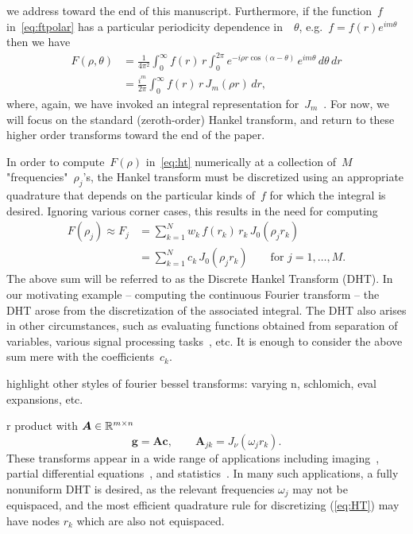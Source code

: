 we address toward the end of this manuscript. Furthermore, if the function~$f$
in~\eqref{eq:ftpolar} has a particular periodicity dependence in~~$\theta$,
e.g.~$f = f(r)e^{im\theta}$ then we have
\begin{equation}
  \begin{aligned}
  F(\rho,\theta) &= \frac{1}{4\pi^2} \int_0^\infty f(r) \, r \int_0^{2\pi} 
  e^{-i \rho r \cos(\alpha - \theta) } \, e^{im\theta}  \, d\theta \, dr \\
  &= \frac{i^m}{2\pi} \int_0^\infty f(r) \, r \, J_m(\rho r)  \, dr,
  \end{aligned}
\end{equation}
where, again, we have invoked an integral representation for~$J_m$~\cite{}.
For now, we will focus on the standard (zeroth-order) Hankel transform, and
return to these higher order transforms toward the end of the paper.

In order to compute~$F(\rho)$ in~\eqref{eq:ht} numerically at a collection
of~$M$ "frequencies"~$\rho_j$'s, the Hankel transform must be discretized using
an appropriate quadrature that depends on the particular kinds of~$f$ for which
the integral is desired. Ignoring various corner cases, this results in the need
for computing
\begin{equation}
  \begin{aligned}
  F(\rho_j) \approx F_j &= \sum_{k=1}^N w_k \, f(r_k) \, r_k \, J_0(\rho_j r_k) \\
  &= \sum_{k=1}^N c_k \, J_0(\rho_j r_k)
   \qquad \text{for } j = 1, \ldots, M.
  \end{aligned}
\end{equation}
The above sum will be referred to as the Discrete Hankel Transform (DHT). In our
motivating example -- computing the continuous Fourier transform -- the DHT
arose from the discretization of the associated integral. The DHT also arises in
other circumstances, such as evaluating functions obtained from separation of
variables, various signal processing tasks~\cite{}, etc. It is enough to
consider the above sum mere with the coefficients~$c_k$.





{\color{red}
highlight other styles of fourier bessel transforms: varying n, schlomich, eval
expansions, etc.
}



r
product with $\bm{A} \in \mathbb{R}^{m \times n}$
\begin{equation}
    \bm{g} = \bm{A}\bm{c}, \qquad \bm{A}_{jk} = J_\nu(\omega_j r_k).
\end{equation}
These transforms appear in a wide range of applications including
imaging~\cite{higgins1988hankel, zhao2013fourier}, partial differential
equations~\cite{bisseling1985fast,ali1999generalized}, and
statistics~\cite{lord1954a, genton2002nonparametric}. In many such
applications, a fully nonuniform DHT is desired, as the relevant frequencies
$\omega_j$ may not be equispaced, and the most efficient quadrature rule for
discretizing (\ref{eq:HT}) may have nodes $r_k$ which are also not equispaced.





